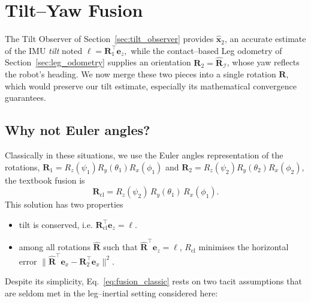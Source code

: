 \documentclass{IJCAS}
\begin{document}
\section{Tilt--Yaw Fusion}
\label{sec:axisAgnostic}

The Tilt Observer of Section~\ref{sec:tilt_observer} provides $\hat{\boldsymbol{x}}_{2}$,  an accurate
estimate of the IMU \emph{tilt} noted
\(
  \boldsymbol{\ell}=\boldsymbol{R}_{1}^{\top}\boldsymbol{e}_{z},
\)
while the contact–based Leg odometry of
Section~\ref{sec:leg_odometry} supplies an orientation \(\boldsymbol{R}_{2} = \hat{\boldsymbol{R}}_{\mathcal{I}}\), whose
yaw reflects the robot's heading.  We now merge these two pieces into a single rotation \(\boldsymbol{R}\), which would preserve our tilt estimate, especially its mathematical convergence guarantees.

\subsection{Why not Euler angles?}

Classically in these situations, we use the Euler angles representation of the rotations,
\(\boldsymbol{R}_{1}=R_{z}(\psi_{1})R_{y}(\theta_{1})R_{x}(\phi_{1})\) and
\(\boldsymbol{R}_{2}=R_{z}(\psi_{2})R_{y}(\theta_{2})R_{x}(\phi_{2})\),
the textbook fusion is
\begin{equation}
  \boldsymbol{R}_{\mathrm{cl}}
  =R_{z}(\psi_{2})\,R_{y}(\theta_{1})\,R_{x}(\phi_{1}).
  \label{eq:fusion_classic}
\end{equation}
This solution has two properties
\begin{itemize}[leftmargin=0pt]
\item tilt is conserved, i.e. 
\(\boldsymbol{R}_{\mathrm{cl}}^{\top}\boldsymbol{e}_{z}=\boldsymbol{\ell}\).
\item among all rotations \(\hat{\boldsymbol{R}}\) such that
\(\hat{\boldsymbol{R}}^{\top}\boldsymbol{e}_{z}=\boldsymbol{\ell}\),
\(R_{\mathrm{cl}}\) minimises the horizontal error
\(
  \|
    \hat{\boldsymbol{R}}^{\top}\boldsymbol{e}_{x}-\boldsymbol{R}_{2}^{\top}\boldsymbol{e}_{x}
  \|^{2}.
\)
\end{itemize}


Despite its simplicity, Eq.~\eqref{eq:fusion_classic} rests on two tacit
assumptions that are seldom met in the leg–inertial setting considered
here:
\end{document}
